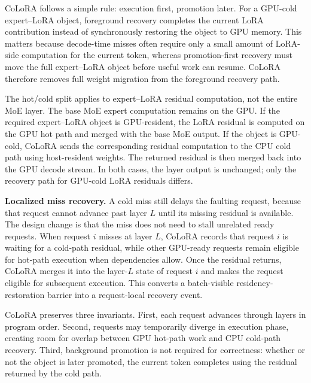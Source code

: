 \documentclass[sigplan,anonymous,review,10pt]{acmart}
\begin{document}
CoLoRA follows a simple rule: execution first, promotion later. For a GPU-cold expert--LoRA object, foreground recovery completes the current LoRA contribution instead of synchronously restoring the object to GPU memory. This matters because decode-time misses often require only a small amount of LoRA-side computation for the current token, whereas promotion-first recovery must move the full expert--LoRA object before useful work can resume. CoLoRA therefore removes full weight migration from the foreground recovery path.

The hot/cold split applies to expert--LoRA residual computation, not the entire MoE layer. The base MoE expert computation remains on the GPU. If the required expert--LoRA object is GPU-resident, the LoRA residual is computed on the GPU hot path and merged with the base MoE output. If the object is GPU-cold, CoLoRA sends the corresponding residual computation to the CPU cold path using host-resident weights. The returned residual is then merged back into the GPU decode stream. In both cases, the layer output is unchanged; only the recovery path for GPU-cold LoRA residuals differs.

\noindent\textbf{Localized miss recovery.}
A cold miss still delays the faulting request, because that request cannot advance past layer $L$ until its missing residual is available. The design change is that the miss does not need to stall unrelated ready requests. When request $i$ misses at layer $L$, CoLoRA records that request $i$ is waiting for a cold-path residual, while other GPU-ready requests remain eligible for hot-path execution when dependencies allow. Once the residual returns, CoLoRA merges it into the layer-$L$ state of request $i$ and makes the request eligible for subsequent execution. This converts a batch-visible residency-restoration barrier into a request-local recovery event.

CoLoRA preserves three invariants. First, each request advances through layers in program order. Second, requests may temporarily diverge in execution phase, creating room for overlap between GPU hot-path work and CPU cold-path recovery. Third, background promotion is not required for correctness: whether or not the object is later promoted, the current token completes using the residual returned by the cold path.

\end{document}
